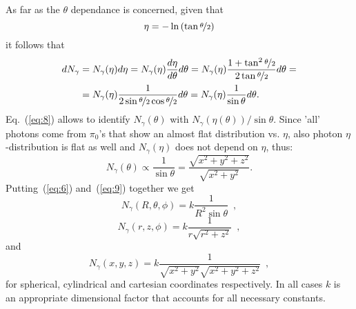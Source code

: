 As far as the $\theta$ dependance is concerned, given that 
\begin{equation}
\eta = -\ln \left( \tan \nicefrac{\theta}{2} \right)
\label{eq:7}
\end{equation}
it follows that
\begin{equation}
\begin{split}
dN_\gamma & = N_\gamma(\eta) d\eta  =
N_\gamma(\eta)\frac{d\eta}{d\theta} d\theta  = N_\gamma(\eta)\frac{1+\tan^2\nicefrac[]{\theta}{2}
 }{2\tan\nicefrac{\theta}{2}}  d\theta =\\ 
 & =
 N_\gamma(\eta)\frac{1}{2\sin\nicefrac[]{\theta}{2}\cos\nicefrac[]{\theta}{2}}  d\theta  
 = N_\gamma(\eta)\frac{1}{\sin\theta}  d\theta .
\label{eq:8}
\end{split}
\end{equation}
Eq.~(\ref{eq:8}) allows to identify $N_\gamma(\theta)$ with $N_\gamma(\eta(\theta))/\sin{\theta}$.
Since 'all' photons come from $\pi_0$'s that show an almost flat
distribution vs. $\eta$, also photon $\eta$-distribution is flat as
well and $N_\gamma(\eta)$ does not depend on $\eta$, thus:
\begin{equation}
N_\gamma(\theta) \propto \frac{1}{\sin \theta} = \frac{\sqrt{x^2+y^2+z^2}}{\sqrt{x^2+y^2}}.
\label{eq:9}
\end{equation}
Putting~(\ref{eq:6}) and~(\ref{eq:9}) together we get 
\begin{equation}
N_{\gamma} (R, \theta, \phi) = k \frac{1}{R^2\sin \theta} \, \, \, ,
\label{eq:10pre}
\end{equation}
\begin{equation}
N_{\gamma} (r, z, \phi) = k \frac{1}{r\sqrt{r^2+z^2}} \,\,\, ,
\label{eq:10bis}
\end{equation}
and
\begin{equation}
N_{\gamma} (x, y, z) = k \frac{1}{\sqrt{x^2+y^2}\sqrt{x^2+y^2+z^2}} \,\,\, ,
\label{eq:10tris}
\end{equation}
for spherical,
cylindrical and cartesian coordinates
respectively. In all cases $k$ is an appropriate dimensional factor
that accounts for all necessary constants.


